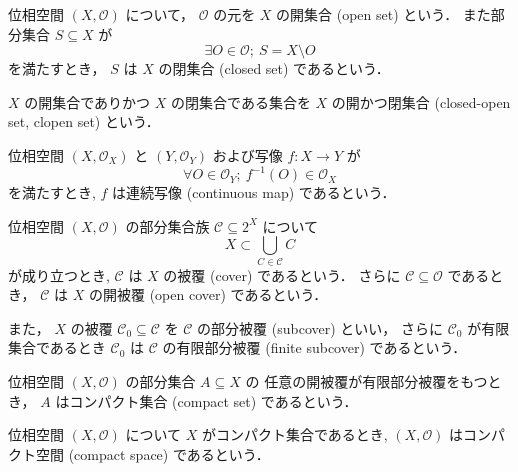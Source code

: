 \documentclass[titlepage]{ltjsreport}
\newtheorem[S]{theorem}{定理}[chapter]
\newtheorem[S]{definition}[theorem]{定義}
\newtheorem[S]{example}[theorem]{例}
\begin{document}
\begin{definition}
  位相空間 $(X,\mathcal{O})$ について，
  $\mathcal{O}$ の元を $X$ の開集合 (open set) という．
  また部分集合 $S\subseteq X$ が
  \begin{equation}
    \exists O\in\mathcal{O};\ S=X\setminus O
  \end{equation}
  を満たすとき，
  $S$ は $X$ の閉集合 (closed set) であるという．

  $X$ の開集合でありかつ $X$ の閉集合である集合を
  $X$ の開かつ閉集合 (closed-open set, clopen set) という．
\end{definition}

\begin{definition}[連続写像]\label{def:continuous-map}
  位相空間 $(X,\mathcal{O}_X)$ と $(Y,\mathcal{O}_Y)$ および写像 $f:X\to Y$ が
  \begin{equation}
    \forall O\in\mathcal{O}_Y;\ f^{-1}(O)\in\mathcal{O}_X
  \end{equation}
  を満たすとき,
  $f$ は連続写像 (continuous map) であるという．
\end{definition}

\begin{definition}
  位相空間 $(X,\mathcal{O})$ の部分集合族 $\mathcal{C}\subseteq2^X$ について
  \begin{equation}
    X\subset\bigcup_{C\in\mathcal{C}}C
  \end{equation}
  が成り立つとき,
  $\mathcal{C}$ は $X$ の被覆 (cover) であるという．
  さらに $\mathcal{C}\subseteq\mathcal{O}$ であるとき，
  $\mathcal{C}$ は $X$ の開被覆 (open cover) であるという．

  また，
  $X$ の被覆 $\mathcal{C}_0\subseteq\mathcal{C}$ を
  $\mathcal{C}$ の部分被覆 (subcover) といい，
  さらに $\mathcal{C}_0$ が有限集合であるとき
  $\mathcal{C}_0$ は $\mathcal{C}$ の有限部分被覆 (finite subcover) であるという．
\end{definition}

\begin{definition}[コンパクト集合]
  位相空間 $(X,\mathcal{O})$ の部分集合 $A\subseteq X$ の
  任意の開被覆が有限部分被覆をもつとき，
  $A$ はコンパクト集合 (compact set) であるという．
\end{definition}

\begin{definition}[コンパクト空間]
  位相空間 $(X,\mathcal{O})$ について $X$ がコンパクト集合であるとき,
  $(X,\mathcal{O})$ はコンパクト空間 (compact space) であるという．
\end{definition}
\end{document}
